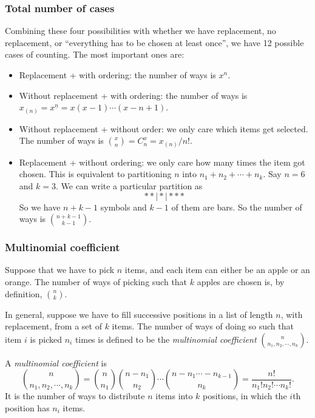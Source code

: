 \documentclass[a4paper]{article}
\begin{document}
\subsubsection*{Total number of cases}
Combining these four possibilities with whether we have replacement, no replacement, or ``everything has to be chosen at least once'', we have 12 possible cases of counting. The most important ones are:
\begin{itemize}
  \item Replacement + with ordering: the number of ways is $x^n$.
  \item Without replacement + with ordering: the number of ways is $x_{(n)} = x^{\underline{n}} = x(x - 1)\cdots (x - n + 1)$.
  \item Without replacement + without order: we only care which items get selected. The number of ways is $\binom{x}{n} = C^x_n = x_{(n)}/n!$.
  \item Replacement + without ordering: we only care how many times the item got chosen. This is equivalent to partitioning $n$ into $n_1 + n_2 + \cdots + n_k$. Say $n = 6$ and $k = 3$. We can write a particular partition as
    \[
      **\mid *\mid ***
    \]
  So we have $n + k - 1$ symbols and $k - 1$ of them are bars. So the number of ways is $\binom{n + k - 1}{k - 1}$.
\end{itemize}

\subsubsection*{Multinomial coefficient}
Suppose that we have to pick $n$ items, and each item can either be an apple or an orange. The number of ways of picking such that $k$ apples are chosen is, by definition, $\binom{n}{k}$.

In general, suppose we have to fill successive positions in a list of length $n$, with replacement, from a set of $k$ items. The number of ways of doing so such that item $i$ is picked $n_i$ times is defined to be the \emph{multinomial coefficient} $\binom{n}{n_1, n_2, \cdots, n_k}$.

\begin{defi}
  A \emph{multinomial coefficient} is
  \[
    \binom{n}{n_1, n_2, \cdots, n_k} = \binom{n}{n_1}\binom{n - n_1}{n_2}\cdots \binom{n - n_1\cdots - n_{k - 1}}{n_k} = \frac{n!}{n_1!n_2!\cdots n_k!}.
  \]
  It is the number of ways to distribute $n$ items into $k$ positions, in which the $i$th position has $n_i$ items.
\end{defi}
\end{document}
